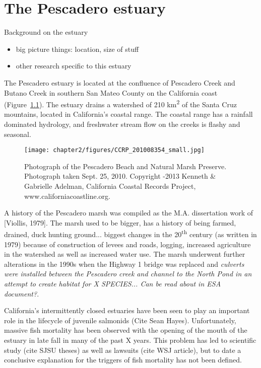 \chapter{The Pescadero estuary} \label{chPescadero}

Background on the estuary

\begin{itemize} \item  big picture things: location, size of stuff \item
other research specific to this estuary \end{itemize}

The Pescadero estuary is located at the confluence of Pescadero Creek
and Butano Creek in southern San Mateo County on the California coast (Figure~\ref{fig:ccrp_2010}).
The estuary drains a watershed of 210 km\textsuperscript{2} of the Santa
Cruz mountains, located in California's coastal range. The coastal range
has a rainfall dominated hydrology, and freshwater stream flow on the
creeks is flashy and seasonal.


% 
\begin{figure}
\texttt{[image: chapter2/figures/CCRP\_201008354\_small.jpg]} \caption{Photograph of the Pescadero Beach and Natural Marsh Preserve. Photograph taken Sept. 25,
2010. Copyright -2013 Kenneth \& Gabrielle
Adelman, California Coastal Records Project,
www.californiacoastline.org.} \label{fig:ccrp_2010} \end{figure}


A history of the Pescadero marsh was compiled as
the M.A. dissertation work of [Viollis, 1979]. The marsh used to be
bigger, has a history of being farmed, drained, duck hunting ground...
biggest changes in the 20\textsuperscript{th} century (as written in
1979) because of construction of levees and roads, logging, increased
agriculture in the watershed as well as increased water use. The marsh underwent further alterations in the 1990s when the Highway 1 bridge was replaced and \emph{culverts were installed between the Pescadero creek and channel to the North Pond in an attempt to create habitat for X SPECIES... Can be read about in ESA document?}.

California's intermittently closed estuaries have been seen to play an important role in the lifecycle of juvenile salmonids (Cite Sean Hayes). Unfortunately, massive fish mortality has been observed with the opening of the mouth of the estuary in late fall in many of the past X years. This problem has led to scientific study (cite SJSU theses) as well as lawsuits (cite WSJ article), but to date a conclusive explanation for the triggers of fish mortality has not been defined. 

